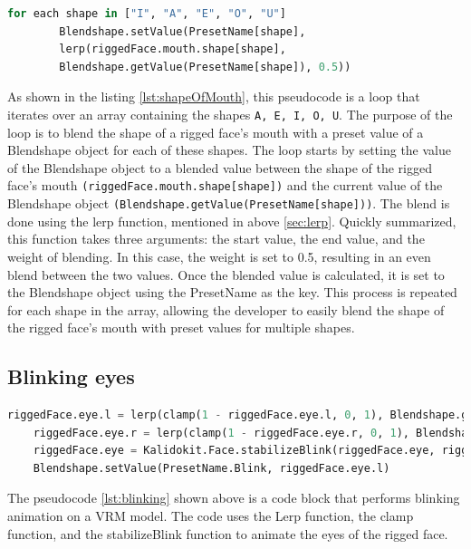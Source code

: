 \begin{lstlisting}[language=Python,caption=Shape of mouth,label=lst:shapeOfMouth]
    for each shape in ["I", "A", "E", "O", "U"]
        Blendshape.setValue(PresetName[shape], 
        lerp(riggedFace.mouth.shape[shape], 
        Blendshape.getValue(PresetName[shape]), 0.5))

\end{lstlisting}
As shown in the listing \ref{lst:shapeOfMouth}, this pseudocode is a loop that iterates over an array containing the shapes \texttt{A, E, I, O, U}. 
The purpose of the loop is to blend the shape of a rigged face's mouth with a preset value of a 
Blendshape object for each of these shapes. The loop starts by setting the value of the Blendshape 
object to a blended value between the shape of the rigged face's mouth \texttt{(riggedFace.mouth.shape[shape])}
and the current value of the Blendshape object \texttt{(Blendshape.getValue(PresetName[shape]))}. 
The blend is done using the lerp function, mentioned in above \ref{sec:lerp}. 
Quickly summarized, this function takes three arguments: the start value, the end value, and the weight of blending. 
In this case, the weight is set to 0.5, resulting in an even blend between the two values.
Once the blended value is calculated, it is set to the Blendshape object using the PresetName 
as the key. This process is repeated for each shape in the array, allowing the developer to 
easily blend the shape of the rigged face's mouth with preset values for multiple shapes.

\subsection{Blinking eyes}
\begin{lstlisting}[language=Python,caption=Blinking of the eyes,label=lst:blinking]
    riggedFace.eye.l = lerp(clamp(1 - riggedFace.eye.l, 0, 1), Blendshape.getValue(PresetName.Blink), 0.5)
    riggedFace.eye.r = lerp(clamp(1 - riggedFace.eye.r, 0, 1), Blendshape.getValue(PresetName.Blink), 0.5)
    riggedFace.eye = Kalidokit.Face.stabilizeBlink(riggedFace.eye, riggedFace.head.y)
    Blendshape.setValue(PresetName.Blink, riggedFace.eye.l)

\end{lstlisting}
The pseudocode \ref{lst:blinking} shown above is a code block that performs blinking animation on a VRM model. 
The code uses the Lerp function, the clamp function, and the stabilizeBlink function 
to animate the eyes of the rigged face.

